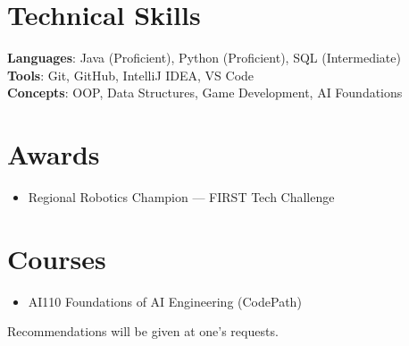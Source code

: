 \documentclass[letterpaper,11pt]{article}
\begin{document}
%
\section{Technical Skills}
 \begin{itemize}[leftmargin=0.15in, label={}]
   \small{\item{
    \textbf{Languages}{: Java (Proficient), Python (Proficient), SQL (Intermediate)} \\
    \textbf{Tools}{: Git, GitHub, IntelliJ IDEA, VS Code} \\
    \textbf{Concepts}{: OOP, Data Structures, Game Development, AI Foundations}
   }}
 \end{itemize}
\section{Awards}
\begin{itemize}[leftmargin=0.15in, label={}]
  \item Regional Robotics Champion --- FIRST Tech Challenge
\end{itemize}

\section{Courses}
\begin{itemize}[leftmargin=0.15in, label={}]
  \item AI110 Foundations of AI Engineering (CodePath)
\end{itemize}





\vspace{0.5em}
\begin{center}
  {\footnotesize Recommendations will be given at one's requests.}
\end{center}
\end{document}
